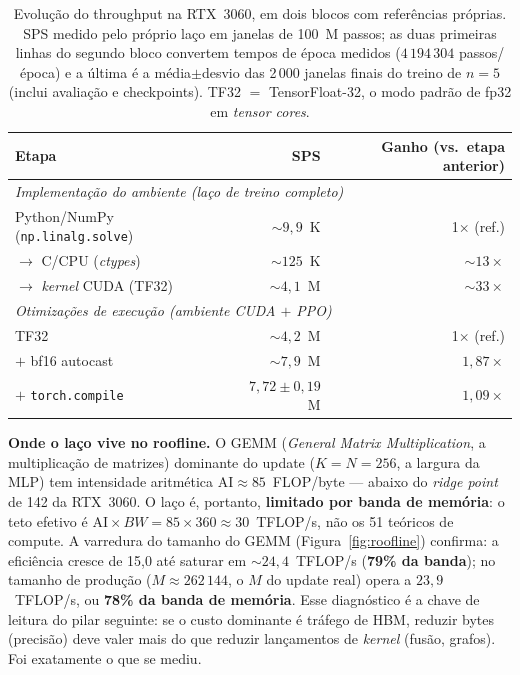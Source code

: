 \documentclass[12pt]{article}
\begin{document}
\begin{table}[ht]
\centering
\caption{Evolução do throughput na RTX~3060, em dois blocos com referências
próprias. SPS medido pelo próprio laço em janelas de 100~M passos; as duas
primeiras linhas do segundo bloco convertem tempos de época medidos
($4\,194\,304$ passos/época) e a última é a média$\pm$desvio das 2\,000
janelas finais do treino de $n{=}5$ (inclui avaliação e checkpoints). TF32 $=$
TensorFloat-32, o modo padrão de fp32 em \emph{tensor cores}.}
\label{tab:throughput-cumulativo}
\small
\begin{tabular}{lrr}
\toprule
Etapa & SPS & Ganho (vs.\ etapa anterior)\\
\midrule
\multicolumn{3}{l}{\emph{Implementação do ambiente (laço de treino completo)}}\\
Python/NumPy (\texttt{np.linalg.solve}) & ${\sim}9{,}9$~K & 1$\times$ (ref.)\\
\quad $\to$ C/CPU (\emph{ctypes}) & ${\sim}125$~K & ${\sim}13\times$\\
\quad $\to$ \emph{kernel} CUDA (TF32) & ${\sim}4{,}1$~M & ${\sim}33\times$\\
\midrule
\multicolumn{3}{l}{\emph{Otimizações de execução (ambiente CUDA $+$ PPO)}}\\
TF32 & ${\sim}4{,}2$~M & 1$\times$ (ref.)\\
\quad $+$ bf16 autocast & ${\sim}7{,}9$~M & $1{,}87\times$\\
\quad $+$ \texttt{torch.compile} & $7{,}72 \pm 0{,}19$~M & $1{,}09\times$\\
\bottomrule
\end{tabular}
\end{table}

\textbf{Onde o laço vive no roofline.} O GEMM (\emph{General Matrix
Multiplication}, a multiplicação de matrizes) dominante do update
($K{=}N{=}256$, a largura da MLP) tem intensidade aritmética
$\mathrm{AI} \approx 85$~FLOP/byte --- abaixo do \emph{ridge point} de 142 da
RTX~3060. O laço é, portanto, \textbf{limitado por banda de memória}: o teto
efetivo é $\mathrm{AI} \times BW = 85 \times 360 \approx 30$~TFLOP/s, não os
51 teóricos de compute. A varredura do tamanho do GEMM
(Figura~\ref{fig:roofline}) confirma: a eficiência cresce de 15,0 até saturar
em ${\sim}24{,}4$~TFLOP/s (\textbf{79\% da banda}); no tamanho de produção
($M \approx 262\,144$, o $M$ do update real) opera a $23{,}9$~TFLOP/s, ou
\textbf{78\% da banda de memória}. Esse diagnóstico é a
chave de leitura do pilar seguinte: se o custo dominante é tráfego de HBM,
reduzir bytes (precisão) deve valer mais do que reduzir lançamentos de
\emph{kernel} (fusão, grafos). Foi exatamente o que se mediu.
\end{document}
